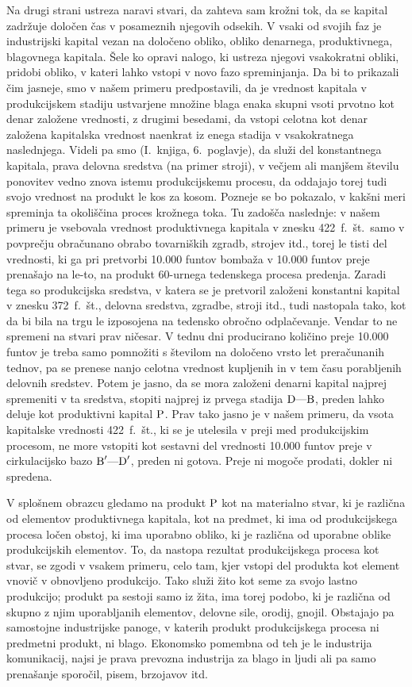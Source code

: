 \documentclass[kapital_02.tex]{subfiles}
\begin{document}
Na drugi strani ustreza naravi stvari, da zahteva sam krožni tok, da se kapital zadržuje določen čas v posameznih njegovih odsekih. V vsaki od svojih faz je industrijski kapital vezan na določeno obliko, obliko denarnega, produktivnega, blagovnega kapitala. Šele ko opravi nalogo, ki ustreza njegovi vsakokratni obliki, pridobi obliko, v kateri lahko vstopi v novo fazo spreminjanja. Da bi to prikazali čim jasneje, smo v našem primeru predpostavili, da je vrednost kapitala v produkcijskem stadiju ustvarjene množine blaga enaka skupni vsoti prvotno kot denar založene vrednosti, z drugimi besedami, da vstopi celotna kot denar založena kapitalska vrednost naenkrat iz enega stadija v vsakokratnega naslednjega. Videli pa smo (I.~knjiga, 6.~poglavje), da služi del konstantnega kapitala, prava delovna sredstva (na primer stroji), v večjem ali manjšem številu ponovitev vedno znova istemu produkcijskemu procesu, da oddajajo torej tudi svojo vrednost na produkt le kos za kosom. Pozneje se bo pokazalo, v kakšni meri spreminja ta okoliščina proces krožnega toka. Tu zadošča naslednje: v našem primeru je vsebovala vrednost produktivnega kapitala v znesku 422~f.~št.\ samo v povprečju obračunano obrabo tovarniških zgradb, strojev itd., torej le tisti del vrednosti, ki ga pri pretvorbi 10.000 funtov bombaža v 10.000 funtov preje prenašajo na le-to, na produkt 60-urnega tedenskega procesa predenja. Zaradi tega so produkcijska sredstva, v katera se je pretvoril založeni konstantni kapital v znesku 372~f.~št., delovna sredstva, zgradbe, stroji itd., tudi nastopala tako, kot da bi bila na trgu le izposojena na tedensko obročno odplačevanje. Vendar to ne spremeni na stvari prav ničesar. V tednu dni producirano količino preje 10.000 funtov je treba samo pomnožiti s številom na določeno vrsto let preračunanih tednov, pa se prenese nanjo celotna vrednost kupljenih in v tem času porabljenih delovnih sredstev. Potem je jasno, da se mora založeni denarni kapital najprej spremeniti v ta sredstva, stopiti najprej iz prvega stadija \( \textrm{D}\textrm{---}\textrm{B} \), preden lahko deluje kot produktivni kapital \( \textrm{P} \). Prav tako jasno je v našem primeru, da vsota kapitalske vrednosti 422~f.~št., ki se je utelesila v preji med produkcijskim procesom, ne more vstopiti kot sestavni del vrednosti 10.000 funtov preje v cirkulacijsko bazo \( \textrm{B}'\textrm{---}\textrm{D}' \), preden ni gotova. Preje ni mogoče prodati, dokler ni spredena.

V splošnem obrazcu gledamo na produkt \( \textrm{P} \) kot na materialno stvar, ki je različna od elementov produktivnega kapitala, kot na predmet, ki ima od produkcijskega procesa ločen obstoj, ki ima uporabno obliko, ki je različna od uporabne oblike produkcijskih elementov. To, da nastopa rezultat produkcijskega procesa kot stvar, se zgodi v vsakem primeru, celo tam, kjer vstopi del produkta kot element vnovič v obnovljeno produkcijo. Tako služi žito kot seme za svojo lastno produkcijo; produkt pa sestoji samo iz žita, ima torej podobo, ki je različna od skupno z njim uporabljanih elementov, delovne sile, orodij, gnojil. Obstajajo pa samostojne industrijske panoge, v katerih produkt produkcijskega procesa ni predmetni produkt, ni blago. Ekonomsko pomembna od teh je le industrija komunikacij, najsi je prava prevozna industrija za blago in ljudi ali pa samo prenašanje sporočil, pisem, brzojavov itd.
\end{document}
